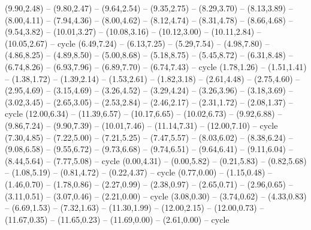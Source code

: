 \providecommand\Gebirge[1]{\csname geo:Gebirge:#1\endcsname}
\def\GebirgeListe{Boehmerwald,Harz,Vogesen,Sudeten,Erzgebirge,Ardennen,Jura,Alpen}
\expandafter\def\csname geo:Gebirge:Boehmerwald\endcsname{
  (9.90,2.48) -- (9.80,2.47) -- (9.64,2.54) -- (9.35,2.75) -- (8.29,3.70) -- (8.13,3.89) -- (8.00,4.11) -- (7.94,4.36) -- (8.00,4.62) -- (8.12,4.74) -- (8.31,4.78) -- (8.66,4.68) -- (9.54,3.82) -- (10.01,3.27) -- (10.08,3.16) -- (10.12,3.00) -- (10.11,2.84) -- (10.05,2.67) -- cycle}
\expandafter\def\csname geo:Gebirge:Harz\endcsname{
  (6.49,7.24) -- (6.13,7.25) -- (5.29,7.54) -- (4.98,7.80) -- (4.86,8.25) -- (4.89,8.50) -- (5.00,8.68) -- (5.18,8.75) -- (5.45,8.72) -- (6.31,8.48) -- (6.74,8.26) -- (6.93,7.96) -- (6.89,7.70) -- (6.74,7.43) -- cycle}
\expandafter\def\csname geo:Gebirge:Vogesen\endcsname{
  (1.78,1.26) -- (1.51,1.41) -- (1.38,1.72) -- (1.39,2.14) -- (1.53,2.61) -- (1.82,3.18) -- (2.61,4.48) -- (2.75,4.60) -- (2.95,4.69) -- (3.15,4.69) -- (3.26,4.52) -- (3.29,4.24) -- (3.26,3.96) -- (3.18,3.69) -- (3.02,3.45) -- (2.65,3.05) -- (2.53,2.84) -- (2.46,2.17) -- (2.31,1.72) -- (2.08,1.37) -- cycle}
\expandafter\def\csname geo:Gebirge:Sudeten\endcsname{
  (12.00,6.34) -- (11.39,6.57) -- (10.17,6.65) -- (10.02,6.73) -- (9.92,6.88) -- (9.86,7.24) -- (9.90,7.39) -- (10.01,7.46) -- (11.14,7.31) -- (12.00,7.10) -- cycle}
\expandafter\def\csname geo:Gebirge:Erzgebirge\endcsname{
  (7.30,4.85) -- (7.22,5.00) -- (7.21,5.25) -- (7.47,5.57) -- (8.03,6.02) -- (8.38,6.24) -- (9.08,6.58) -- (9.55,6.72) -- (9.73,6.68) -- (9.74,6.51) -- (9.64,6.41) -- (9.11,6.04) -- (8.44,5.64) -- (7.77,5.08) -- cycle}
\expandafter\def\csname geo:Gebirge:Ardennen\endcsname{
  (0.00,4.31) -- (0.00,5.82) -- (0.21,5.83) -- (0.82,5.68) -- (1.08,5.19) -- (0.81,4.72) -- (0.22,4.37) -- cycle}
\expandafter\def\csname geo:Gebirge:Jura\endcsname{
  (0.77,0.00) -- (1.15,0.48) -- (1.46,0.70) -- (1.78,0.86) -- (2.27,0.99) -- (2.38,0.97) -- (2.65,0.71) -- (2.96,0.65) -- (3.11,0.51) -- (3.07,0.46) -- (2.21,0.00) -- cycle}
\expandafter\def\csname geo:Gebirge:Alpen\endcsname{
  (3.08,0.30) -- (3.74,0.62) -- (4.33,0.83) -- (6.69,1.53) -- (7.32,1.63) -- (11.30,1.99) -- (12.00,2.15) -- (12.00,0.73) -- (11.67,0.35) -- (11.65,0.23) -- (11.69,0.00) -- (2.61,0.00) -- cycle}

